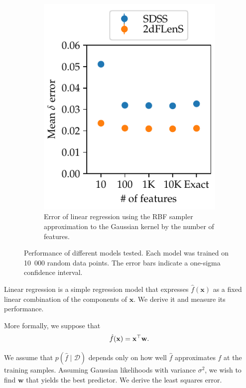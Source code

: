 \documentclass[11pt,twoside,openright]{report}
\newcommand\bw{\mathbf{w}}
\newcommand\bx{\mathbf{x}}
\newcommand\cD{\mathcal{D}}
\begin{document}
\begin{figure}
\begin{subfigure}{0.4\textwidth}
    \includegraphics[width=\textwidth]{linreg_kernel_appx.pdf}
    \caption{Error of linear regression using the RBF sampler approximation to the Gaussian kernel by the number of features.}
    \label{fig:linreg_kernel_appx}
  \end{subfigure}

  \caption{Performance of different models tested. Each model was trained on 10~000 random data points. The error bars indicate a one-sigma confidence interval.}

\end{figure}



Linear regression is a simple regression model that expresses $\hat f(\bx)$ as a fixed linear combination of the components of $\bx$. \citep{Bishop} We derive it and measure its performance.

More formally, we suppose that \[
  \hat f(\bx) = \bx^\top\bw \text.
\]

We assume that $p(\hat f \mid \cD)$ depends only on how well $\hat f$ approximates $f$ at the training samples. Assuming Gaussian likelihoods with variance $\sigma^2$, we wish to find $\bw$ that yields the best predictor. We derive the least squares error.
\end{document}
